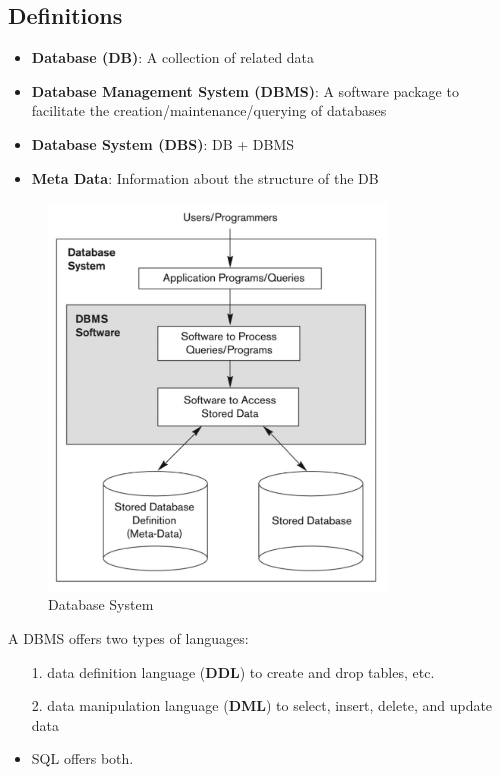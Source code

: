 \subsection{Definitions}
\begin{itemize}[label=\(\rhd\)]
    \item \textbf{Database (DB)}: A collection of related data
    \item \textbf{Database Management System (DBMS)}: A software package to facilitate the creation/maintenance/querying of databases
    \item \textbf{Database System (DBS)}: DB + DBMS
    \item \textbf{Meta Data}: Information about the structure of the DB
\end{itemize}

\begin{figure}[H]
\centering
\includegraphics[width=0.8\textwidth]{images/Screenshot 2024-05-01 at 17.02.18.jpg}
\caption{Database System}
\end{figure}

A DBMS offers two types of languages:
\begin{itemize}[label=\(\rhd\)]
    \item[1.] data definition language (\textbf{DDL}) to create and drop tables, etc.
    \item[2.] data manipulation language (\textbf{DML}) to select, insert, delete, and update data 
    \item SQL offers both.
\end{itemize}

